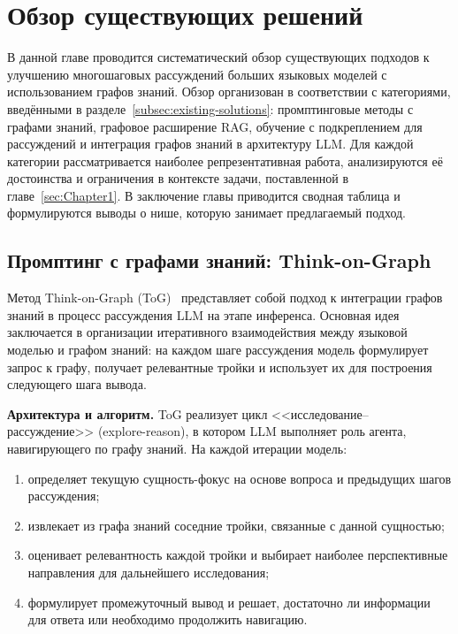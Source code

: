 \section{Обзор существующих решений}
\label{sec:Chapter2} 

В данной главе проводится систематический обзор существующих подходов к улучшению многошаговых рассуждений больших языковых моделей с использованием графов знаний. Обзор организован в соответствии с категориями, введёнными в разделе~\ref{subsec:existing-solutions}: промптинговые методы с графами знаний, графовое расширение RAG, обучение с подкреплением для рассуждений и интеграция графов знаний в архитектуру LLM. Для каждой категории рассматривается наиболее репрезентативная работа, анализируются её достоинства и ограничения в контексте задачи, поставленной в главе~\ref{sec:Chapter1}. В заключение главы приводится сводная таблица и формулируются выводы о нише, которую занимает предлагаемый подход.

\subsection{Промптинг с графами знаний: Think-on-Graph}
\label{subsec:think-on-graph}

Метод Think-on-Graph (ToG)~\cite{sun2024thinkongraph} представляет собой подход к интеграции графов знаний в процесс рассуждения LLM на этапе инференса. Основная идея заключается в организации итеративного взаимодействия между языковой моделью и графом знаний: на каждом шаге рассуждения модель формулирует запрос к графу, получает релевантные тройки и использует их для построения следующего шага вывода.

\textbf{Архитектура и алгоритм.}
ToG реализует цикл <<исследование--рассуждение>> (explore-reason), в котором LLM выполняет роль агента, навигирующего по графу знаний. На каждой итерации модель:
\begin{enumerate}
    \item определяет текущую сущность-фокус на основе вопроса и предыдущих шагов рассуждения;
    \item извлекает из графа знаний соседние тройки, связанные с данной сущностью;
    \item оценивает релевантность каждой тройки и выбирает наиболее перспективные направления для дальнейшего исследования;
    \item формулирует промежуточный вывод и решает, достаточно ли информации для ответа или необходимо продолжить навигацию.
\end{enumerate}

